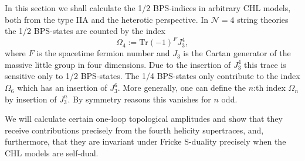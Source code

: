 \documentclass[a4paper,11pt]{article}
\numberwithin{equation}{section}
\def\be{\begin{equation}}
\def\ee{\end{equation}}
\begin{document}
In this section we shall calculate the 1/2 BPS-indices in arbitrary CHL models, both from the type IIA and the heterotic perspective. In $\mathcal{N}=4$ string theories the 1/2 BPS-states are counted by the index
\be
\Omega_4:= \text{Tr}(-1)^F J_3^{4}, 
\ee
where $F$ is the spacetime fermion number and $J_3$ is the Cartan generator of the massive little group in four dimensions. Due to the 
insertion of $J_3^4$ this trace is sensitive only to 1/2 BPS-states. The 1/4 BPS-states only contribute to the index $\Omega_6$ which 
 has an insertion of $J_3^6$. More generally, one can define the $n$:th index $\Omega_n$ by insertion of $J_3^{n}$. By symmetry 
reasons this vanishes for $n$ odd. 
 
We will  calculate certain   one-loop topological amplitudes and show that they receive contributions precisely from the fourth helicity supertraces, and, furthermore, that they are invariant under Fricke S-duality precisely when the CHL models are self-dual.
\end{document}
